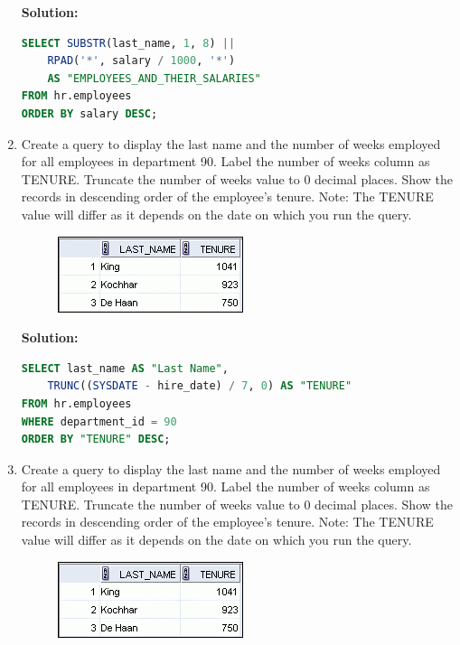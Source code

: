 \documentclass[a4paper,12pt]{article}
\begin{document}
\begin{enumerate}
\textbf{Solution: }
        \begin{lstlisting}[language=SQL, label={lst:employees_data}]
SELECT SUBSTR(last_name, 1, 8) || 
    RPAD('*', salary / 1000, '*') 
    AS "EMPLOYEES_AND_THEIR_SALARIES"
FROM hr.employees
ORDER BY salary DESC;
    \end{lstlisting}
    \newpage
            \item Create a query to display the last name and the number of weeks employed for all employees in
department 90. Label the number of weeks column as TENURE. Truncate the number of weeks
value to 0 decimal places. Show the records in descending order of the employee's tenure.
Note: The TENURE value will differ as it depends on the date on which you run the query.
    \begin{figure}[h]
        \centering
        \includegraphics*[width=.5\linewidth]{graphics/39.png}
    \end{figure}

\textbf{Solution: }
        \begin{lstlisting}[language=SQL, label={lst:employees_data}]
SELECT last_name AS "Last Name",
    TRUNC((SYSDATE - hire_date) / 7, 0) AS "TENURE"
FROM hr.employees
WHERE department_id = 90
ORDER BY "TENURE" DESC;
    \end{lstlisting}
    \item Create a query to display the last name and the number of weeks employed for all employees in
department 90. Label the number of weeks column as TENURE. Truncate the number of weeks
value to 0 decimal places. Show the records in descending order of the employee's tenure.
Note: The TENURE value will differ as it depends on the date on which you run the query.
    \begin{figure}[h]
        \centering
        \includegraphics*[width=.3\linewidth]{graphics/39.png}
    \end{figure}


\end{enumerate}
\end{document}
